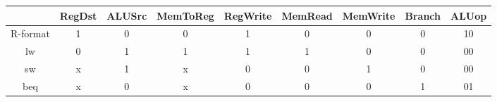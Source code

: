 \begin{tabular}[t]{ccccccccc}
	\toprule
	         & RegDst & ALUSrc & MemToReg & RegWrite & MemRead & MemWrite & Branch & ALUop \\
	\midrule
	R-format & 1      & 0      & 0        & 1        & 0       & 0        & 0      & 10    \\
	lw       & 0      & 1      & 1        & 1        & 1       & 0        & 0      & 00    \\
	sw       & x      & 1      & x        & 0        & 0       & 1        & 0      & 00    \\
	beq      & x      & 0      & x        & 0        & 0       & 0        & 1      & 01    \\
	\bottomrule
\end{tabular}

